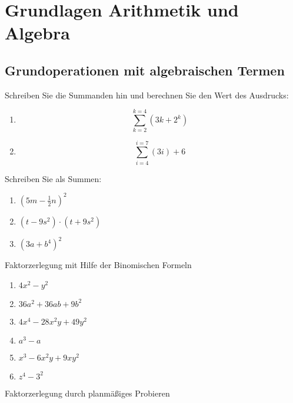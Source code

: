 

\section{Grundlagen Arithmetik und Algebra}







\subsection{Grundoperationen mit algebraischen Termen}
Schreiben Sie die Summanden hin und berechnen Sie den Wert des Ausdrucks:
\begin{enumerate}[label=\alph*)]
 \item $$\sum_{k=2}^{k=4}{(3k+2^k)}$$ 
 \item $$\sum_{i=4}^{i=7}(3i) + 6$$   
\end{enumerate}


Schreiben Sie als Summen:

\begin{multicols}{2}
\begin{enumerate}[label=\alph*)]
\item $\left(5m-\frac{1}{2}n\right)^2$
\item $(t-9s^2)\cdot(t+9s^2)$
  \item $(3a + b^4)^2$
  \end{enumerate}
\end{multicols}

Faktorzerlegung mit Hilfe der Binomischen Formeln

\begin{multicols}{2}
\begin{enumerate}[label=\alph*)]
\item $4x^2-y^2$
\item $36a^2 + 36ab + 9b^2$
\item $4x^4-28x^2y+49y^2$
\item $a^3-a$
\item $x^3-6x^2y+9xy^2$
  \item $z^4 -3^2$
\end{enumerate}
\end{multicols}

Faktorzerlegung durch planmäßiges Probieren

